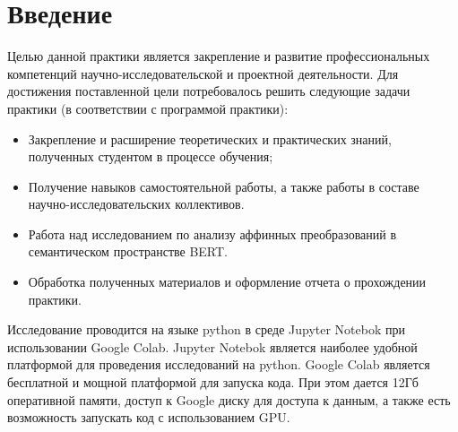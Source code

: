 \documentclass[a4paper,14pt]{article}
\begin{document}
\captionsetup[figure]{labelformat=simple, labelsep=endash}
	 
	
	\tableofcontents
	
	\pagebreak
	
	
	
	
	
	
	
	
	
	\section{Введение}
	
	Целью данной практики является закрепление и развитие профессиональных компетенций научно-исследовательской и проектной деятельности.
	Для достижения поставленной цели потребовалось решить следующие задачи практики (в соответствии с программой практики):
	
	\begin{itemize}
	
		\item Закрепление и расширение теоретических и практических знаний, полученных студентом в процессе обучения;
		
		\item Получение навыков самостоятельной работы, а также работы в составе научно-исследовательских коллективов.
		
		\item Работа над исследованием по анализу аффинных преобразований в семантическом пространстве BERT.
		
		\item Обработка полученных материалов и оформление отчета о прохождении практики.
			
	\end{itemize}

	Исследование проводится на языке python в среде Jupyter Notebok при использовании Google Colab. Jupyter Notebok является наиболее удобной платформой для проведения исследований на python.
	Google Colab является бесплатной и мощной платформой для запуска кода.
	При этом дается 12Гб оперативной памяти, доступ к Google диску для доступа к данным, а также есть возможность запускать код с использованием GPU.
	
\end{document}
